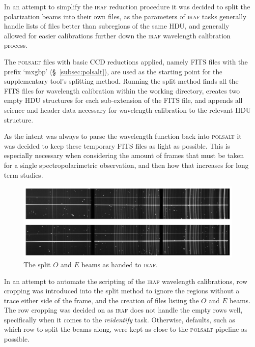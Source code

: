 In an attempt to simplify the \textsc{iraf} reduction procedure it was decided to split the polarization beams into their own files, as the parameters of \textsc{iraf} tasks generally handle lists of files better than subregions of the same \gls{HDU}, and generally allowed for easier calibrations further down the \textsc{iraf} wavelength calibration process.
\prgph

The \textsc{polsalt} files with basic \gls{CCD} reductions applied, namely \gls{FITS} files with the prefix `mxgbp' (\S~\ref{subsec:polsalt}), are used as the starting point for the supplementary tool's splitting method. Running the split method finds all the \gls{FITS} files for wavelength calibration within the working directory, creates two empty \gls{HDU} structures for each sub-extension of the \gls{FITS} file, and appends all science and header data necessary for wavelength calibration to the relevant \gls{HDU} structure.
\prgph

As the intent was always to parse the wavelength function back into \textsc{polsalt} it was decided to keep these temporary \gls{FITS} files as light as possible. This is especially necessary when considering the amount of frames that must be taken for a single spectropolarimetric observation, and then how that increases for long term studies.
\prgph

\begin{figure}[t]
    \centering
    \includegraphics[width = 1.0\textwidth]{figures/3_OEsplit.pdf}
    \caption{The split $O$ and $E$ beams as handed to \textsc{iraf}.}
    \label{fig:OE_split}
\end{figure}

In an attempt to automate the scripting of the \textsc{iraf} wavelength calibrations, row cropping was introduced into the split method to ignore the regions without a trace either side of the frame, and the creation of files listing the $O$ and $E$ beams. The row cropping was decided on as \textsc{iraf} does not handle the empty rows well, specifically when it comes to the \textit{reidentify} task. Otherwise, defaults, such as which row to split the beams along, were kept as close to the \textsc{polsalt} pipeline as possible.


